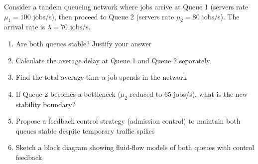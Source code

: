 \begin{exercise}
Consider a tandem queueing network where jobs arrive at Queue 1 (servers rate $\mu_1 = 100$ jobs/s), then proceed to Queue 2 (servers rate $\mu_2 = 80$ jobs/s). The arrival rate is $\lambda = 70$ jobs/s.
\begin{enumerate}[label=(\alph*)]
    \item Are both queues stable? Justify your answer
    \item Calculate the average delay at Queue 1 and Queue 2 separately
    \item Find the total average time a job spends in the network
    \item If Queue 2 becomes a bottleneck ($\mu_2$ reduced to 65 jobs/s), what is the new stability boundary?
    \item Propose a feedback control strategy (admission control) to maintain both queues stable despite temporary traffic spikes
    \item Sketch a block diagram showing fluid-flow models of both queues with control feedback
\end{enumerate}
\end{exercise}
